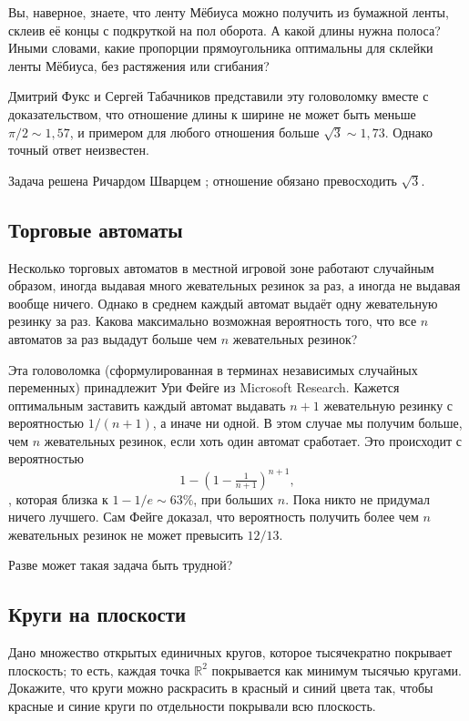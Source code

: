 Вы, наверное, знаете, что ленту Мёбиуса можно получить из бумажной ленты, склеив её концы с подкруткой на пол оборота.
А какой длины нужна полоса?
Иными словами, какие пропорции прямоугольника оптимальны для склейки ленты Мёбиуса, без растяжения или сгибания?

Дмитрий Фукс и Сергей Табачников представили эту головоломку \cite[Лекция 14]{19} вместе с доказательством, что отношение длины к ширине не может быть меньше $\pi/2 \sim 1{,}57$, и примером для любого отношения больше $\sqrt{3} \sim 1{,}73$.
Однако точный ответ неизвестен.

\begin{addedbytheeditors}
Задача решена Ричардом Шварцем \cite{schwartz}; отношение обязано превосходить $\sqrt{3}$.
\pr
\end{addedbytheeditors}


\subsection*{Торговые автоматы}

Несколько торговых автоматов в местной игровой зоне работают случайным образом,
иногда выдавая много жевательных резинок за раз, а иногда не выдавая вообще ничего.
Однако в среднем каждый автомат выдаёт одну жевательную резинку за раз.
Какова максимально возможная вероятность того, что все $n$ автоматов за раз выдадут больше чем $n$ жевательных резинок?

\medskip

Эта головоломка (сформулированная в терминах независимых случайных переменных) принадлежит Ури Фейге из Microsoft Research.
Кажется оптимальным заставить каждый автомат выдавать $n + 1$ жевательную резинку с вероятностью $1/(n + 1)$,
а иначе ни одной.
В этом случае мы получим больше, чем $n$ жевательных резинок, если хоть один автомат сработает.
Это происходит с вероятностью
\[1-(1-\tfrac1{n+1})^{n+1},\], которая близка к $1 - 1/e \sim 63\%$, при больших $n$.
Пока никто не придумал ничего лучшего.
Сам Фейге доказал, что вероятность получить более чем $n$ жевательных резинок не может превысить $12/13$.

Разве может такая задача быть трудной?

\subsection*{Круги на плоскости}

Дано множество открытых единичных кругов, которое тысячекратно покрывает плоскость;
то есть, каждая точка $\mathbb{R}^2$ покрывается как минимум тысячью кругами.
Докажите, что круги можно раскрасить в красный и синий цвета так,
чтобы красные и синие круги по отдельности покрывали всю плоскость.

